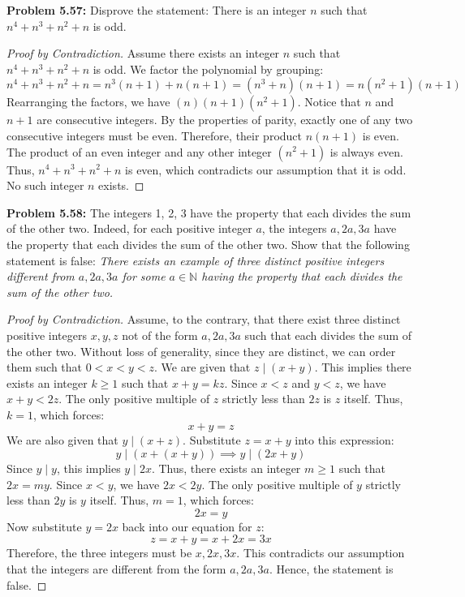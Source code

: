 \documentclass[11pt, a4paper]{article}
\theoremstyle{definition}
\theoremstyle{remark}
\newcommand{\N}{\mathbb{N}}
\begin{document}
\textbf{Problem 5.57:} Disprove the statement: There is an integer $n$ such that $n^4 + n^3 + n^2 + n$ is odd.
\begin{proof}[Proof by Contradiction]
    Assume there exists an integer $n$ such that $n^4 + n^3 + n^2 + n$ is odd.
    We factor the polynomial by grouping:
    \[ n^4 + n^3 + n^2 + n = n^3(n + 1) + n(n + 1) = (n^3 + n)(n + 1) = n(n^2 + 1)(n + 1) \]
    Rearranging the factors, we have $(n)(n+1)(n^2+1)$.
    Notice that $n$ and $n+1$ are consecutive integers. By the properties of parity, exactly one of any two consecutive integers must be even. 
    Therefore, their product $n(n+1)$ is even. 
    The product of an even integer and any other integer $(n^2+1)$ is always even.
    Thus, $n^4 + n^3 + n^2 + n$ is even, which contradicts our assumption that it is odd. No such integer $n$ exists.
\end{proof}

\textbf{Problem 5.58:} The integers 1, 2, 3 have the property that each divides the sum of the other two. Indeed, for each positive integer $a$, the integers $a, 2a, 3a$ have the property that each divides the sum of the other two. Show that the following statement is false: \textit{There exists an example of three distinct positive integers different from $a, 2a, 3a$ for some $a \in \N$ having the property that each divides the sum of the other two.}
\begin{proof}[Proof by Contradiction]
    Assume, to the contrary, that there exist three distinct positive integers $x, y, z$ not of the form $a, 2a, 3a$ such that each divides the sum of the other two.
    Without loss of generality, since they are distinct, we can order them such that $0 < x < y < z$.
    We are given that $z \mid (x+y)$. This implies there exists an integer $k \ge 1$ such that $x+y = kz$.
    Since $x < z$ and $y < z$, we have $x+y < 2z$. The only positive multiple of $z$ strictly less than $2z$ is $z$ itself. Thus, $k=1$, which forces:
    \[ x+y = z \]
    We are also given that $y \mid (x+z)$. Substitute $z = x+y$ into this expression:
    \[ y \mid (x + (x+y)) \implies y \mid (2x+y) \]
    Since $y \mid y$, this implies $y \mid 2x$. Thus, there exists an integer $m \ge 1$ such that $2x = my$.
    Since $x < y$, we have $2x < 2y$. The only positive multiple of $y$ strictly less than $2y$ is $y$ itself. Thus, $m=1$, which forces:
    \[ 2x = y \]
    Now substitute $y = 2x$ back into our equation for $z$:
    \[ z = x + y = x + 2x = 3x \]
    Therefore, the three integers must be $x, 2x, 3x$. This contradicts our assumption that the integers are different from the form $a, 2a, 3a$. Hence, the statement is false.
\end{proof}
\end{document}
